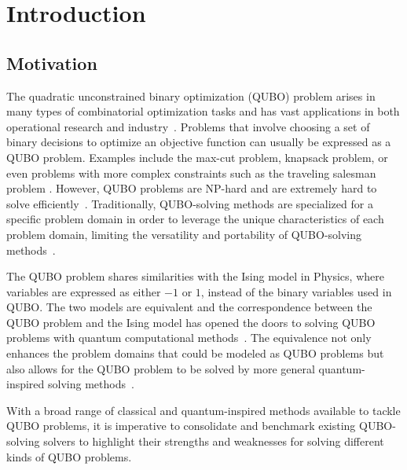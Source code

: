 
\chapter{Introduction}
\vspace{2em}

\section{Motivation}
The quadratic unconstrained binary optimization (QUBO) problem arises in many types of combinatorial optimization tasks and has vast applications in both operational research and industry~\cite{b1}. Problems that involve choosing a set of binary decisions to optimize an objective function can usually be expressed as a QUBO problem. Examples include the max-cut problem, knapsack problem, or even problems with more complex constraints such as the traveling salesman problem \cite{b10}. However, QUBO problems are NP-hard and are extremely hard to solve efficiently~\cite{barahona1982computational,b1}. Traditionally, QUBO-solving methods are specialized for a specific problem domain in order to leverage the unique characteristics of each problem domain, limiting the versatility and portability of QUBO-solving methods~\cite{b5}.

The QUBO problem shares similarities with the Ising model in Physics, where variables are expressed as either $-1$ or $1$, instead of the binary variables used in QUBO. The two models are equivalent and the correspondence between the QUBO problem and the Ising model has opened the doors to solving QUBO problems with quantum computational methods~\cite{b5}. The equivalence not only enhances the problem domains that could be modeled as QUBO problems but also allows for the QUBO problem to be solved by more general quantum-inspired solving methods~\cite{b5}.

With a broad range of classical and quantum-inspired methods available to tackle QUBO problems, it is imperative to consolidate and benchmark existing QUBO-solving solvers to highlight their strengths and weaknesses for solving different kinds of QUBO problems.

